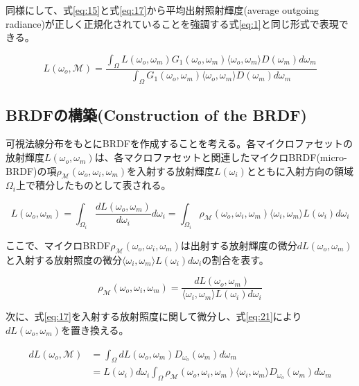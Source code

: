 \documentclass[a4j,xelatex,ja=standard]{bxjsarticle}
\begin{document}
同様にして、式\eqref{eq:15}と式\eqref{eq:17}から平均出射照射輝度(average outgoing radiance)が正しく正規化されていることを強調する式\eqref{eq:1}と同じ形式で表現できる。

\begin{equation}
    L(\omega_o, \mathcal{M}) = \frac{\int_\Omega L(\omega_o, \omega_m) G_1(\omega_o, \omega_m) \langle \omega_o, \omega_m \rangle D(\omega_m) d \omega_m}{\int_\Omega G_1(\omega_o, \omega_m) \langle \omega_o, \omega_m \rangle D(\omega_m)d \omega_m}
    \label{eq:19}
\end{equation}

\subsection{BRDFの構築(Construction of the BRDF)}
\label{sec:3.2}

可視法線分布をもとにBRDFを作成することを考える。各マイクロファセットの放射輝度$L(\omega_o, \omega_m)$は、各マクロファセットと関連したマイクロBRDF(micro-BRDF)の項$\rho_{\mathcal M}(\omega_o, \omega_i, \omega_m)$を入射する放射輝度$L(\omega_i)$とともに入射方向の領域$\Omega_i$上で積分したものとして表される。

\begin{equation}
    L(\omega_o, \omega_m) = \int_{\Omega_i} \frac{dL(\omega_o, \omega_m)}{d\omega_i} d\omega_i = \int_{\Omega_i} \rho_{\mathcal M}(\omega_o, \omega_i, \omega_m) \langle \omega_i, \omega_m \rangle L(\omega_i) d\omega_i
    \label{eq:20}
\end{equation}

ここで、マイクロBRDF$\rho_{\mathcal M}(\omega_o, \omega_i, \omega_m)$は出射する放射輝度の微分$dL(\omega_o, \omega_m)$と入射する放射照度の微分$\langle \omega_i, \omega_m \rangle L(\omega_i) d\omega_i$の割合を表す。

\begin{equation}
    \rho_{\mathcal M}(\omega_o, \omega_i, \omega_m) = \frac{dL(\omega_o, \omega_m)}{\langle \omega_i, \omega_m \rangle L(\omega_i) d\omega_i}
    \label{eq:21}
\end{equation}

次に、式\eqref{eq:17}を入射する放射照度に関して微分し、式\eqref{eq:21}により$dL(\omega_o, \omega_m)$を置き換える。

\begin{equation}
    \begin{split}
        dL(\omega_o, \mathcal{M})
        &= \int_{\Omega} dL(\omega_o, \omega_m) D_{\omega_o}(\omega_m) d\omega_m \\
        &= L(\omega_i) d\omega_i \int_{\Omega} \rho_{\mathcal M}(\omega_o, \omega_i, \omega_m) \langle \omega_i, \omega_m \rangle D_{\omega_o}(\omega_m) d\omega_m
    \end{split}
    \label{eq:22}
\end{equation}
\end{document}
